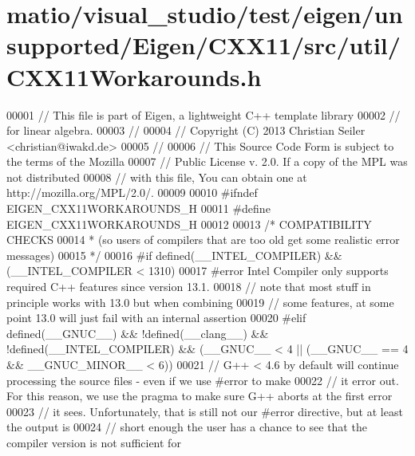 \hypertarget{matio_2visual__studio_2test_2eigen_2unsupported_2_eigen_2_c_x_x11_2src_2util_2_c_x_x11_workarounds_8h_source}{}\section{matio/visual\+\_\+studio/test/eigen/unsupported/\+Eigen/\+C\+X\+X11/src/util/\+C\+X\+X11\+Workarounds.h}
\label{matio_2visual__studio_2test_2eigen_2unsupported_2_eigen_2_c_x_x11_2src_2util_2_c_x_x11_workarounds_8h_source}

\begin{DoxyCode}
00001 \textcolor{comment}{// This file is part of Eigen, a lightweight C++ template library}
00002 \textcolor{comment}{// for linear algebra.}
00003 \textcolor{comment}{//}
00004 \textcolor{comment}{// Copyright (C) 2013 Christian Seiler <christian@iwakd.de>}
00005 \textcolor{comment}{//}
00006 \textcolor{comment}{// This Source Code Form is subject to the terms of the Mozilla}
00007 \textcolor{comment}{// Public License v. 2.0. If a copy of the MPL was not distributed}
00008 \textcolor{comment}{// with this file, You can obtain one at http://mozilla.org/MPL/2.0/.}
00009 
00010 \textcolor{preprocessor}{#ifndef EIGEN\_CXX11WORKAROUNDS\_H}
00011 \textcolor{preprocessor}{#define EIGEN\_CXX11WORKAROUNDS\_H}
00012 
00013 \textcolor{comment}{/* COMPATIBILITY CHECKS}
00014 \textcolor{comment}{ * (so users of compilers that are too old get some realistic error messages)}
00015 \textcolor{comment}{ */}
00016 \textcolor{preprocessor}{#if defined(\_\_INTEL\_COMPILER) && (\_\_INTEL\_COMPILER < 1310)}
00017 \textcolor{preprocessor}{#error Intel Compiler only supports required C++ features since version 13.1.}
00018 \textcolor{comment}{// note that most stuff in principle works with 13.0 but when combining}
00019 \textcolor{comment}{// some features, at some point 13.0 will just fail with an internal assertion}
00020 \textcolor{preprocessor}{#elif defined(\_\_GNUC\_\_) && !defined(\_\_clang\_\_) && !defined(\_\_INTEL\_COMPILER) && (\_\_GNUC\_\_ < 4 || (\_\_GNUC\_\_
       == 4 && \_\_GNUC\_MINOR\_\_ < 6))}
00021 \textcolor{comment}{// G++ < 4.6 by default will continue processing the source files - even if we use #error to make}
00022 \textcolor{comment}{// it error out. For this reason, we use the pragma to make sure G++ aborts at the first error}
00023 \textcolor{comment}{// it sees. Unfortunately, that is still not our #error directive, but at least the output is}
00024 \textcolor{comment}{// short enough the user has a chance to see that the compiler version is not sufficient for}

\end{DoxyCode}
